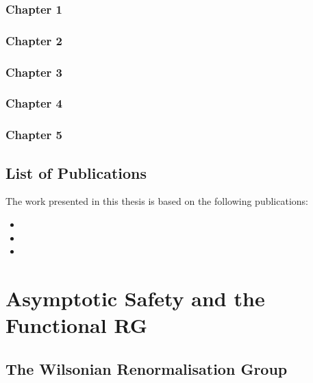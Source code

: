 \documentclass[11pt]{book} %
\numberwithin{equation}{chapter}
\begin{document}
\subsection*{Chapter 1}
\subsection*{Chapter 2}
\subsection*{Chapter 3}
\subsection*{Chapter 4}
\subsection*{Chapter 5}

\section*{List of Publications}

The work presented in this thesis is based on the following publications:%
\bigskip
\begin{itemize}
  \setlength\itemsep{0.7em}
  \item {}
  \item {}
  \item {}
\end{itemize}



\mainmatter
\chapter[Asymptotic Safety and the Functional Renormalisation Group]{Asymptotic Safety and the Functional RG}

\section{The Wilsonian Renormalisation Group}

\end{document}
